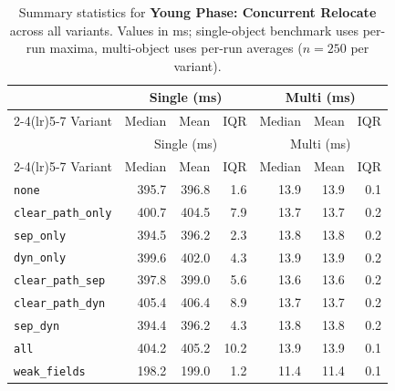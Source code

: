 \begin{longtable}{l rrr rrr}
\caption[Young Phase: Concurrent Relocate summary statistics]{Summary statistics for \textbf{Young Phase: Concurrent Relocate} across all variants. Values in ms; single-object benchmark uses per-run maxima, multi-object uses per-run averages ($n=250$ per variant).}\label{tab:stats-young-relocate} \\
\toprule
 & \multicolumn{3}{c}{Single (ms)} & \multicolumn{3}{c}{Multi (ms)} \\
\cmidrule(lr){2-4}\cmidrule(lr){5-7}
Variant & Median & Mean & IQR & Median & Mean & IQR \\
\midrule
\endfirsthead
\toprule
 & \multicolumn{3}{c}{Single (ms)} & \multicolumn{3}{c}{Multi (ms)} \\
\cmidrule(lr){2-4}\cmidrule(lr){5-7}
Variant & Median & Mean & IQR & Median & Mean & IQR \\
\midrule
\endhead
\bottomrule
\endfoot
\texttt{none} & 395.7 & 396.8 & 1.6 & 13.9 & 13.9 & 0.1 \\
\texttt{clear\_path\_only} & 400.7 & 404.5 & 7.9 & 13.7 & 13.7 & 0.2 \\
\texttt{sep\_only} & 394.5 & 396.2 & 2.3 & 13.8 & 13.8 & 0.2 \\
\texttt{dyn\_only} & 399.6 & 402.0 & 4.3 & 13.9 & 13.9 & 0.2 \\
\texttt{clear\_path\_sep} & 397.8 & 399.0 & 5.6 & 13.6 & 13.6 & 0.2 \\
\texttt{clear\_path\_dyn} & 405.4 & 406.4 & 8.9 & 13.7 & 13.7 & 0.2 \\
\texttt{sep\_dyn} & 394.4 & 396.2 & 4.3 & 13.8 & 13.8 & 0.2 \\
\texttt{all} & 404.2 & 405.2 & 10.2 & 13.9 & 13.9 & 0.1 \\
\texttt{weak\_fields} & 198.2 & 199.0 & 1.2 & 11.4 & 11.4 & 0.1 \\
\end{longtable}
